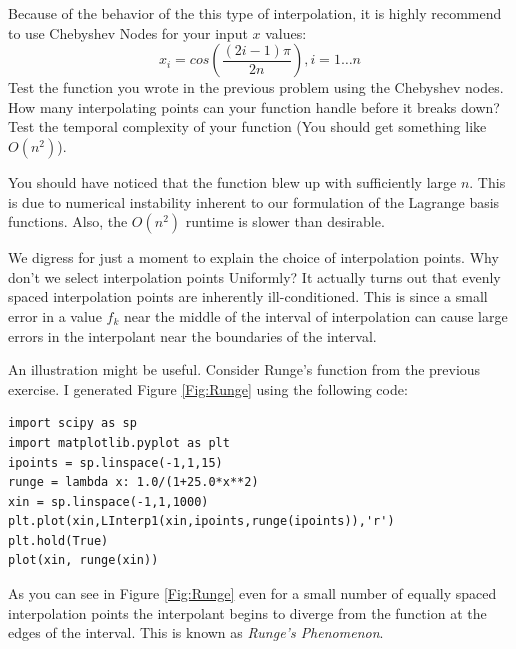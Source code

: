 \begin{problem}
Because of the behavior of the this type of interpolation, it is highly recommend to use Chebyshev Nodes for your input $x$ values:
\[
x_i = cos\left(\frac{(2i-1)\pi}{2n}\right), i = 1\ldots n
\]
Test the function you wrote in the previous problem using the Chebyshev nodes. How many interpolating points can your function handle before it breaks down? Test the temporal complexity of your function (You should get something like $O(n^2)$).
\end{problem}

You should have noticed that the function blew up with sufficiently large $n$. This is due to numerical instability inherent to our formulation of the Lagrange basis functions. Also, the $O(n^2)$ runtime is slower than desirable.

We digress for just a moment to explain the choice of interpolation points. Why don't we select interpolation points Uniformly? It actually turns out that evenly spaced interpolation points are inherently ill-conditioned. This is since a small error in a value $f_k$ near the middle of the interval of interpolation can cause large errors in the interpolant near the boundaries of the interval.

An illustration might be useful. Consider Runge's function from the previous exercise. I generated Figure \ref{Fig:Runge} using the following code:

\begin{lstlisting}
import scipy as sp
import matplotlib.pyplot as plt
ipoints = sp.linspace(-1,1,15)
runge = lambda x: 1.0/(1+25.0*x**2)
xin = sp.linspace(-1,1,1000)
plt.plot(xin,LInterp1(xin,ipoints,runge(ipoints)),'r')
plt.hold(True)
plot(xin, runge(xin))
\end{lstlisting}

As you can see in Figure \ref{Fig:Runge} even for a small number of equally spaced interpolation points the interpolant begins to diverge from the function at the edges of the interval. This is known as \emph{Runge's Phenomenon}.

